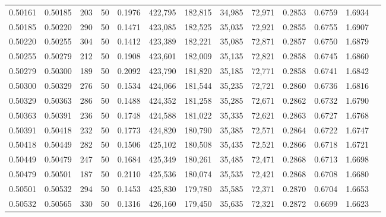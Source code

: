 \begin{tabular}{rrrrrrrrrrrrr}
0.50161 & 0.50185 &   203 &  50 &                                     0.1976 & 422,795 & 182,815 &  34,985 &  72,971 & 0.2853 & 0.6759 & 1.6934 \\
0.50185 & 0.50220 &   290 &  50 &                                     0.1471 & 423,085 & 182,525 &  35,035 &  72,921 & 0.2855 & 0.6755 & 1.6907 \\
0.50220 & 0.50255 &   304 &  50 &                                     0.1412 & 423,389 & 182,221 &  35,085 &  72,871 & 0.2857 & 0.6750 & 1.6879 \\
0.50255 & 0.50279 &   212 &  50 &                                     0.1908 & 423,601 & 182,009 &  35,135 &  72,821 & 0.2858 & 0.6745 & 1.6860 \\
0.50279 & 0.50300 &   189 &  50 &                                     0.2092 & 423,790 & 181,820 &  35,185 &  72,771 & 0.2858 & 0.6741 & 1.6842 \\
0.50300 & 0.50329 &   276 &  50 &                                     0.1534 & 424,066 & 181,544 &  35,235 &  72,721 & 0.2860 & 0.6736 & 1.6816 \\
0.50329 & 0.50363 &   286 &  50 &                                     0.1488 & 424,352 & 181,258 &  35,285 &  72,671 & 0.2862 & 0.6732 & 1.6790 \\
0.50363 & 0.50391 &   236 &  50 &                                     0.1748 & 424,588 & 181,022 &  35,335 &  72,621 & 0.2863 & 0.6727 & 1.6768 \\
0.50391 & 0.50418 &   232 &  50 &                                     0.1773 & 424,820 & 180,790 &  35,385 &  72,571 & 0.2864 & 0.6722 & 1.6747 \\
0.50418 & 0.50449 &   282 &  50 &                                     0.1506 & 425,102 & 180,508 &  35,435 &  72,521 & 0.2866 & 0.6718 & 1.6721 \\
0.50449 & 0.50479 &   247 &  50 &                                     0.1684 & 425,349 & 180,261 &  35,485 &  72,471 & 0.2868 & 0.6713 & 1.6698 \\
0.50479 & 0.50501 &   187 &  50 &                                     0.2110 & 425,536 & 180,074 &  35,535 &  72,421 & 0.2868 & 0.6708 & 1.6680 \\
0.50501 & 0.50532 &   294 &  50 &                                     0.1453 & 425,830 & 179,780 &  35,585 &  72,371 & 0.2870 & 0.6704 & 1.6653 \\
0.50532 & 0.50565 &   330 &  50 &                                     0.1316 & 426,160 & 179,450 &  35,635 &  72,321 & 0.2872 & 0.6699 & 1.6623 \\

\end{tabular}
